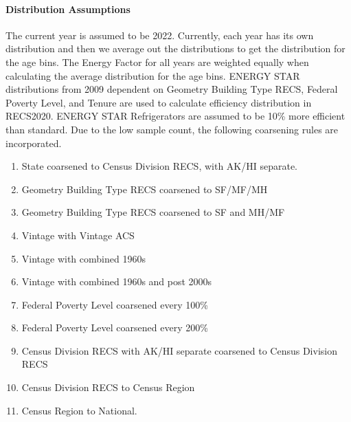 \paragraph{Distribution Assumptions}
% 
The current year is assumed to be 2022. Currently, each year has its own distribution and then we average out the distributions to get the distribution for the age bins. The Energy Factor for all years are weighted equally when calculating the average distribution for the age bins. ENERGY STAR distributions from 2009 dependent on Geometry Building Type RECS, Federal Poverty Level, and Tenure are used to calculate efficiency distribution in RECS2020. ENERGY STAR Refrigerators are assumed to be 10\% more efficient than standard. Due to the low sample count, the following coarsening rules are incorporated.
\begin{enumerate}
    \item  State coarsened to Census Division RECS, with AK/HI separate.
    \item Geometry Building Type RECS coarsened to SF/MF/MH 
    \item Geometry Building Type RECS coarsened to SF and MH/MF 
    \item  Vintage with Vintage ACS 
    \item Vintage with combined 1960s 
    \item Vintage with combined 1960s and post 2000s 
    \item  Federal Poverty Level coarsened every 100\% 
    \item  Federal Poverty Level coarsened every 200\% 
    \item Census Division RECS with AK/HI separate coarsened to Census Division RECS 
    \item  Census Division RECS to Census Region 
    \item Census Region to National. 
\end{enumerate}
